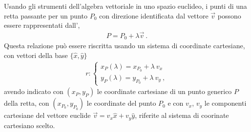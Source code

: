 \documentclass[letterpaper,10pt,english]{jupyterBook}
\begin{document}
\sphinxAtStartPar
{} Usando gli strumenti dell’algebra vettoriale in uno spazio euclideo, i punti di una retta passante per un punto \(P_0\) con direzione identificata dal vettore \(\vec{v}\) possono essere rappresentati dall’,
\begin{equation*}
\begin{split}P = P_0 + \lambda \overrightarrow{v} \ .\end{split}
\end{equation*}
\sphinxAtStartPar
Questa relazione può essere riscritta usando un sistema di coordinate cartesiane, con vettori della base \(\{ \hat{x}, \hat{y}\}\)
\begin{equation*}
\begin{split}r: \begin{cases}
    x_P(\lambda) = x_{P_0} + \lambda \ v_x \\
    y_P(\lambda) = y_{P_0} + \lambda \ v_y \ ,
   \end{cases}
  \end{split}
\end{equation*}
\sphinxAtStartPar
avendo indicato con \((x_P, y_P)\) le coordinate cartesiane di un punto generico \(P\) della retta, con \((x_{P_0}, y_{P_0})\) le coordinate del punto \(P_0\) e con \(v_x\), \(v_y\) le componenti cartesiane del vettore euclide \(\vec{v} = v_x \hat{x} + v_y \hat{y}\), riferite al sistema di coorinate cartesiano scelto.
\end{document}
